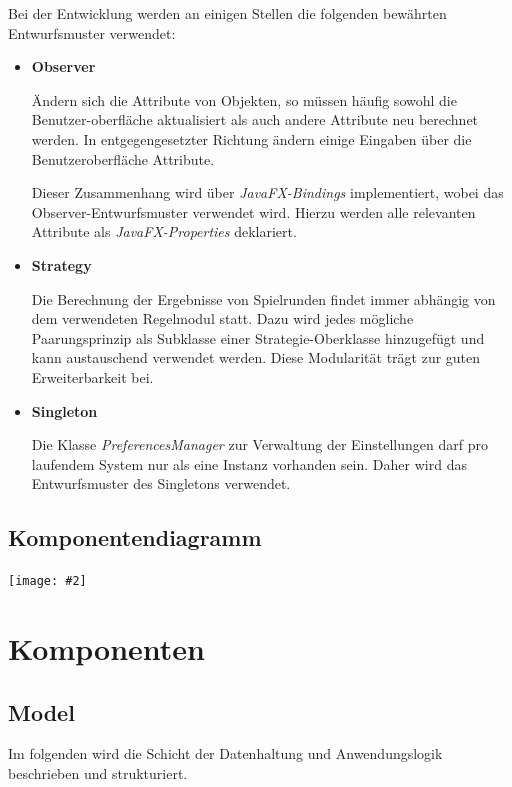\documentclass[11pt]{article}
\newcommand{\includediagram}[2]{
	\begin{center}
		\texttt{[image: \#2]}
	\end{center}
}
\begin{document}
Bei der Entwicklung werden an einigen Stellen die folgenden bewährten Entwurfsmuster verwendet:
\begin{itemize}
	\item[] \textbf{Observer} \hfill
	
	\leftskip 1cm
	Ändern sich die Attribute von Objekten, so müssen häufig sowohl die Benutzer-oberfläche aktualisiert als auch andere Attribute neu berechnet werden. In entgegengesetzter Richtung ändern einige Eingaben über die Benutzeroberfläche Attribute.
	
	Dieser Zusammenhang wird über \textit{JavaFX-Bindings} implementiert, wobei das Observer-Entwurfsmuster verwendet wird. Hierzu werden alle relevanten Attribute als \textit{JavaFX-Properties} deklariert.

	\leftskip 0cm
	\item[] \textbf{Strategy} \hfill
	
	\leftskip 1cm
	Die Berechnung der Ergebnisse von Spielrunden findet immer abhängig von dem verwendeten Regelmodul statt. Dazu wird jedes mögliche Paarungsprinzip als Subklasse einer Strategie-Oberklasse hinzugefügt und kann austauschend verwendet werden. Diese Modularität trägt zur guten Erweiterbarkeit bei.
	
	\leftskip 0cm
	\item[] \textbf{Singleton} \hfill
	
	\leftskip 1cm
	Die Klasse \textit{PreferencesManager} zur Verwaltung der Einstellungen darf pro laufendem System nur als eine Instanz vorhanden sein. Daher wird das Entwurfsmuster des Singletons verwendet.
\end{itemize}

\subsection{Komponentendiagramm}

\includediagram{0.7}{component-diagram.png}

\section{Komponenten}

\subsection{Model}

Im folgenden wird die Schicht der Datenhaltung und Anwendungslogik beschrieben und strukturiert.
\end{document}

